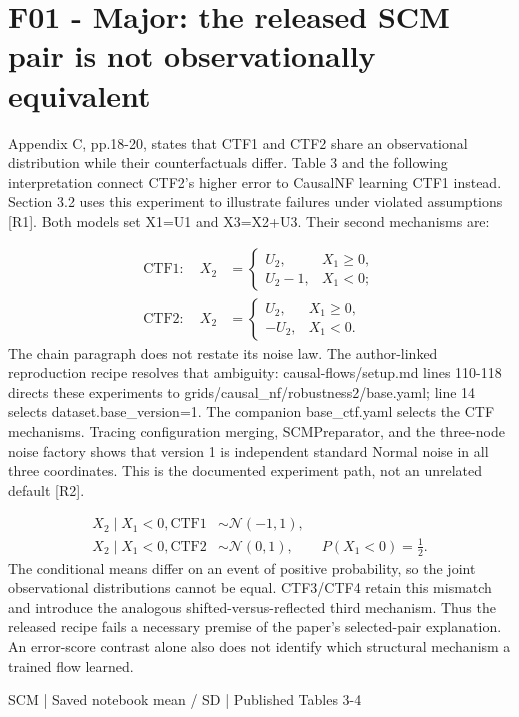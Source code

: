 \documentclass[10pt]{article}
\begin{document}
\section*{F01 - Major: the released SCM pair is not observationally equivalent}
Appendix C, pp.18-20, states that CTF1 and CTF2 share an observational distribution while their counterfactuals differ. Table 3 and the following interpretation connect CTF2’s higher error to CausalNF learning CTF1 instead. Section 3.2 uses this experiment to illustrate failures under violated assumptions [R1]. Both models set X1=U1 and X3=X2+U3. Their second mechanisms are:\par
\[\begin{aligned}\mathrm{CTF1}:\quad X_2&=\begin{cases}U_2,&X_1\geq0,\\U_2-1,&X_1<0;\end{cases}\\\mathrm{CTF2}:\quad X_2&=\begin{cases}U_2,&X_1\geq0,\\-U_2,&X_1<0.\end{cases}\end{aligned}\] The chain paragraph does not restate its noise law. The author-linked reproduction recipe resolves that ambiguity: causal-flows/setup.md lines 110-118 directs these experiments to grids/causal\_nf/robustness2/base.yaml; line 14 selects dataset.base\_version=1. The companion base\_ctf.yaml selects the CTF mechanisms. Tracing configuration merging, SCMPreparator, and the three-node noise factory shows that version 1 is independent standard Normal noise in all three coordinates. This is the documented experiment path, not an unrelated default [R2].\par
\[\begin{aligned}X_2\mid X_1<0,\mathrm{CTF1}&\sim\mathcal N(-1,1),\\X_2\mid X_1<0,\mathrm{CTF2}&\sim\mathcal N(0,1),\qquad P(X_1<0)=\tfrac12.\end{aligned}\] The conditional means differ on an event of positive probability, so the joint observational distributions cannot be equal. CTF3/CTF4 retain this mismatch and introduce the analogous shifted-versus-reflected third mechanism. Thus the released recipe fails a necessary premise of the paper’s selected-pair explanation. An error-score contrast alone also does not identify which structural mechanism a trained flow learned.\par
SCM | Saved notebook mean / SD | Published Tables 3-4\par
\end{document}
